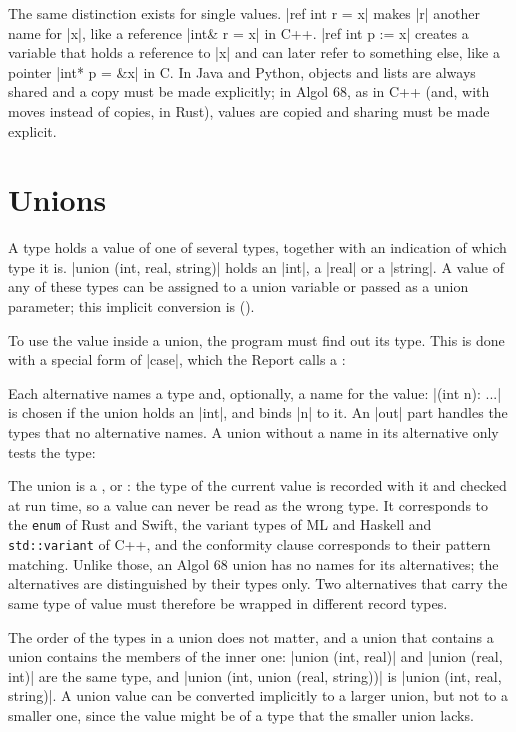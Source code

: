 The same distinction exists for single values. \code|ref int r = x|
makes \code|r| another name for \code|x|, like a reference
\code|int& r = x| in C++. \code|ref int p := x| creates a variable that
holds a reference to \code|x| and can later refer to something else, like
a pointer \code|int* p = &x| in C. In Java and Python, objects and lists
are always shared and a copy must be made explicitly; in Algol 68, as in
C++ (and, with moves instead of copies, in Rust), values are copied and
sharing must be made explicit.

\section{Unions}\label{sec-unions}

A  type holds a value of one of several types, together with
an indication of which type it is. \code|union (int, real, string)| holds
an \code|int|, a \code|real| or a \code|string|. A value of any of these
types can be assigned to a union variable or passed as a union parameter;
this implicit conversion is  ().

To use the value inside a union, the program must find out its type. This
is done with a special form of \code|case|, which the Report calls a
:


Each alternative names a type and, optionally, a name for the value:
\code|(int n): ...| is chosen if the union holds an \code|int|, and binds
\code|n| to it. An \code|out| part handles the types that no alternative
names. A union without a name in its alternative only tests the type:


The union is a , or : the type of the
current value is recorded with it and checked at run time, so a value can
never be read as the wrong type. It corresponds to the \texttt{enum} of
Rust and Swift, the variant types of ML and Haskell and
\texttt{std::variant} of C++, and the conformity clause corresponds to
their pattern matching. Unlike those, an Algol 68 union has no names for
its alternatives; the alternatives are distinguished by their types only.
Two alternatives that carry the same type of value must therefore be
wrapped in different record types.

The order of the types in a union does not matter, and a union that
contains a union contains the members of the inner one:
\code|union (int, real)| and \code|union (real, int)| are the same type,
and \code|union (int, union (real, string))| is
\code|union (int, real, string)|. A union value can be converted
implicitly to a larger union, but not to a smaller one, since the value
might be of a type that the smaller union lacks.

